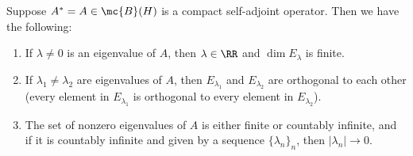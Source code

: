 \begin{theorem}\label{selfadjointeigenspace}
Suppose $A^\ast = A \in \mc{B}(H)$ is a compact self-adjoint operator. Then we have the following:
\begin{enumerate}
\item If $\lambda \ne 0$ is an eigenvalue of $A$, then $\lambda \in \RR$ and $\dim E_\lambda$ is finite. 
\item If $\lambda_1 \ne \lambda_2$ are eigenvalues of $A$, then $E_{\lambda_1}$ and $E_{\lambda_2}$ are orthogonal to each other (every element in $E_{\lambda_1}$ is orthogonal to every element in $E_{\lambda_2}$). 
\item The set of nonzero eigenvalues of $A$ is either finite or countably infinite, and if it is countably infinite and given by a sequence $\{\lambda_n\}_n$, then $|\lambda_n| \to 0$.
\end{enumerate}
\end{theorem}
